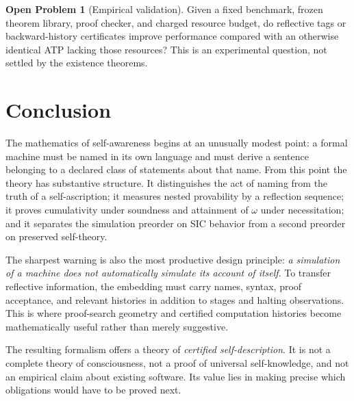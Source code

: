\documentclass[11pt,letterpaper]{article}
\theoremstyle{definition}\newtheorem{definition}[theorem]{Definition}\newtheorem{example}[theorem]{Example}\newtheorem{protocol}[theorem]{Protocol}\newtheorem{question}[theorem]{Open Problem}
\theoremstyle{remark}\newtheorem{remark}[theorem]{Remark}
\begin{document}
\begin{question}[Empirical validation]
Given a fixed benchmark, frozen theorem library, proof checker, and charged resource budget, do reflective tags or backward-history certificates improve performance compared with an otherwise identical ATP lacking those resources? This is an experimental question, not settled by the existence theorems.
\end{question}

\section{Conclusion}
The mathematics of self-awareness begins at an unusually modest point: a formal machine must be named in its own language and must derive a sentence belonging to a declared class of statements about that name. From this point the theory has substantive structure. It distinguishes the act of naming from the truth of a self-ascription; it measures nested provability by a reflection sequence; it proves cumulativity under soundness and attainment of $\omega$ under necessitation; and it separates the simulation preorder on SIC behavior from a second preorder on preserved self-theory.

The sharpest warning is also the most productive design principle: \emph{a simulation of a machine does not automatically simulate its account of itself}. To transfer reflective information, the embedding must carry names, syntax, proof acceptance, and relevant histories in addition to stages and halting observations. This is where proof-search geometry and certified computation histories become mathematically useful rather than merely suggestive.

The resulting formalism offers a theory of \emph{certified self-description}. It is not a complete theory of consciousness, not a proof of universal self-knowledge, and not an empirical claim about existing software. Its value lies in making precise which obligations would have to be proved next.
\end{document}
